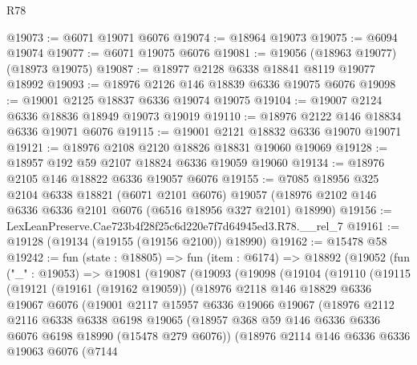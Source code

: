 \begin{lexlean}{R78}
\begin{coremodule}
@19073 := @6071 @19071 @6076
@19074 := @18964 @19073
@19075 := @6094 @19074
@19077 := @6071 @19075 @6076
@19081 := @19056 (@18963 @19077) (@18973 @19075)
@19087 := @18977 @2128 @6338 @18841 @8119 @19077 @18992
@19093 := @18976 @2126 @146 @18839 @6336 @19075 @6076
@19098 := @19001 @2125 @18837 @6336 @19074 @19075
@19104 := @19007 @2124 @6336 @18836 @18949 @19073 @19019
@19110 := @18976 @2122 @146 @18834 @6336 @19071 @6076
@19115 := @19001 @2121 @18832 @6336 @19070 @19071
@19121 := @18976 @2108 @2120 @18826 @18831 @19060 @19069
@19128 := @18957 @192 @59 @2107 @18824 @6336 @19059 @19060
@19134 := @18976 @2105 @146 @18822 @6336 @19057 @6076
@19155 := @7085
    @18956
    @325
    @2104
    @6338
    @18821
    (@6071 @2101 @6076)
    @19057
    (@18976 @2102 @146 @6336 @6336 @2101 @6076 (@6516 @18956 @327 @2101) @18990)
@19156 := LexLeanPreserve.Cae723b4f28f25c6d220e7f7d64945ed3.R78.__rel_7
@19161 := @19128 (@19134 (@19155 (@19156 @2100)) @18990)
@19162 := @15478 @58
@19242 := fun (state : @18805) =>
  fun (item : @6174) =>
  @18892
    (@19052
      (fun ("_" : @19053) =>
      @19081
        (@19087
          (@19093
            (@19098
              (@19104
                (@19110
                  (@19115
                    (@19121
                      (@19161 (@19162 @19059))
                      (@18976
                        @2118
                        @146
                        @18829
                        @6336
                        @19067
                        @6076
                        (@19001
                          @2117
                          @15957
                          @6336
                          @19066
                          @19067
                          (@18976
                            @2112
                            @2116
                            @6338
                            @6338
                            @6198
                            @19065
                            (@18957
                              @368
                              @59
                              @146
                              @6336
                              @6336
                              @6076
                              @6198
                              @18990
                              (@15478 @279 @6076))
                            (@18976
                              @2114
                              @146
                              @6336
                              @6336
                              @19063
                              @6076
                              (@7144

\end{coremodule}
\end{lexlean}
